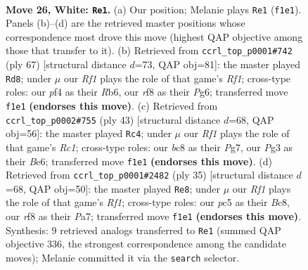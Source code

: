 \documentclass[11pt]{article}
\begin{document}
\clearpage

\begin{figure}[p]\centering
\begin{subfigure}{0.46\textwidth}\centering
\resizebox{\linewidth}{!}{%
\newchessgame
\chessboard[
  setfen={r1bq1rk1/8/8/2p1p2p/5p1P/p1P3P1/P2B1P2/1R1Q1RK1 w - - 0 26},
  showmover=false,
  pgfstyle=straightmove, color=movearrow, markmove={f1-e1}
]}
\caption{}
\end{subfigure}\hfill
\begin{subfigure}{0.46\textwidth}\centering
\resizebox{\linewidth}{!}{%
\newchessgame
\chessboard[
  setfen={5r2/p4k2/1r1q2pp/2pP1p2/2Q1pP2/P3P1P1/7P/1R1R2K1 b - - 6 34},
  showmover=false,
  pgfstyle=straightmove, color=movearrow, markmove={f8-d8}
]}
\caption{}
\end{subfigure}
\\[4pt]
\begin{subfigure}{0.46\textwidth}\centering
\resizebox{\linewidth}{!}{%
\newchessgame
\chessboard[
  setfen={2rqr1k1/1p3pp1/p3b3/P2p4/1P6/3QB2P/5PP1/R3R1K1 b - - 4 22},
  showmover=false,
  pgfstyle=straightmove, color=movearrow, markmove={c8-c4}
]}
\caption{}
\end{subfigure}\hfill
\begin{subfigure}{0.46\textwidth}\centering
\resizebox{\linewidth}{!}{%
\newchessgame
\chessboard[
  setfen={2b2rk1/p3pp1p/1r6/q1pP2BQ/2p5/2P5/P4PP1/R4RK1 b - - 2 18},
  showmover=false,
  pgfstyle=straightmove, color=movearrow, markmove={f8-e8}
]}
\caption{}
\end{subfigure}
\caption{\textbf{Move 26, White: \texttt{Re1}.} (a) Our position; Melanie plays \texttt{Re1} (\texttt{f1e1}). Panels (b)--(d) are the retrieved master positions whose correspondence most drove this move (highest QAP objective among those that transfer to it). (b) Retrieved from \texttt{ccrl\_top\_p0001\#742} (ply 67) [structural distance $d$=73, QAP obj=81]: the master played \texttt{Rd8}; under $\mu$ our \emph{Rf1} plays the role of that game's \emph{Rf1}; cross-type roles: our \emph{p}f4 as their \emph{R}b6, our \emph{r}f8 as their \emph{P}g6; transferred move \texttt{f1e1} \textbf{(endorses this move)}. (c) Retrieved from \texttt{ccrl\_top\_p0002\#755} (ply 43) [structural distance $d$=68, QAP obj=56]: the master played \texttt{Rc4}; under $\mu$ our \emph{Rf1} plays the role of that game's \emph{Rc1}; cross-type roles: our \emph{b}c8 as their \emph{P}g7, our \emph{P}g3 as their \emph{B}e6; transferred move \texttt{f1e1} \textbf{(endorses this move)}. (d) Retrieved from \texttt{ccrl\_top\_p0001\#2482} (ply 35) [structural distance $d$=68, QAP obj=50]: the master played \texttt{Re8}; under $\mu$ our \emph{Rf1} plays the role of that game's \emph{Rf1}; cross-type roles: our \emph{p}c5 as their \emph{B}c8, our \emph{r}f8 as their \emph{P}a7; transferred move \texttt{f1e1} \textbf{(endorses this move)}. Synthesis: 9 retrieved analogs transferred to \texttt{Re1} (summed QAP objective 336, the strongest correspondence among the candidate moves); Melanie committed it via the \texttt{search} selector.}
\label{fig:thought-m50}
\end{figure}
\end{document}
